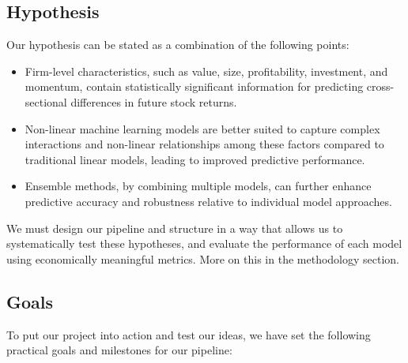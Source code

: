 \documentclass[11pt]{article}
\begin{document}
\subsection{Hypothesis}

Our hypothesis can be stated as a combination of the following points:

\begin{itemize}
    \item Firm-level characteristics, such as value, size, profitability, investment, and momentum, contain statistically significant information for predicting cross-sectional differences in future stock returns.

    \item Non-linear machine learning models are better suited to capture complex interactions and non-linear relationships among these factors compared to traditional linear models, leading to improved predictive performance.

    \item Ensemble methods, by combining multiple models, can further enhance predictive accuracy and robustness relative to individual model approaches.
\end{itemize}

We must design our pipeline and structure in a way that allows us to systematically test these hypotheses, and evaluate the performance of each model using economically meaningful metrics. More on this in the methodology section.

\subsection{Goals}
To put our project into action and test our ideas, we have set the following practical goals and milestones for our pipeline:
\end{document}
